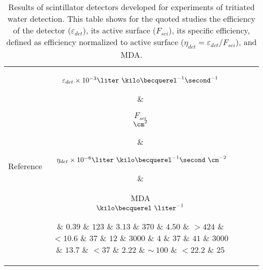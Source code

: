 \begin{table}[htbp]
\centering{}%
\begin{tabular}{lcrcc}
\toprule 
Reference & \parbox{5em}{$\varepsilon_{det}\times10^{-3}\\\liter~\kilo\becquerel^{-1}\second^{-1}$}  & \parbox{3.5em}{\raggedleft $F_{sci}$\\ $\cm^2$}  & \parbox{6.5em}{$~\eta_{det}\times 10^{-6}\\\liter~\kilo\becquerel^{-1}\second~\cm^{-2}$} &  \parbox{3.5em}{MDA\\$\kilo\becquerel~\liter^{-1}$} \tabularnewline
\midrule
\midrule 
\cite{Muramatsu} & $0.39$ & $123$ & $3.13$ & $370$ \tabularnewline
\cite{Moghissi} & $4.50$ & $>424$ & $<10.6$ & $37$ \tabularnewline
\cite{Osborne} & $12$ & $3000$ & $4$ & $37$ \tabularnewline
\cite{Ratnakaran} & $41$ & $3000$ & $13.7$ & $<37$ \tabularnewline
\cite{Hofstetter1} & $2.22$ & $\sim~100$ & $<22.2$ & $25$ \tabularnewline
\bottomrule
\end{tabular}
\caption{Results of scintillator detectors developed for experiments of tritiated water detection. This table shows for the quoted studies the efficiency of the detector ($\varepsilon_{det}$), its active surface ($F_{sci}$), its specific efficiency, defined as efficiency normalized to active surface ($\eta_{det}=\varepsilon_{det}/F_{sci}$), and MDA.}
\label{tab:PlasticScinTritium}
\end{table}